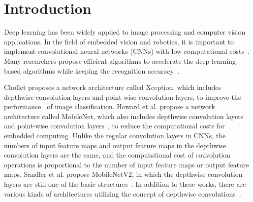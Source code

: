 \documentclass[runningheads]{llncs}
\begin{document}
\section{Introduction}
\label{sec:introduction}

Deep learning has been widely applied to image processing and computer vision applications. In the field of embedded vision and robotics, it is important to implement convolutional neural networks (CNNs) with low computational costs~\cite{Chen19}. Many researchers propose efficient algorithms to accelerate the deep-learning-based algorithms while keeping the recognition accuracy~\cite{Chollet16,Han19,Howard17,Qin20,Sandler18,Tan19,Tan19_2}.

Chollet proposes a network architecture called Xception, which includes depthwise convolution layers and point-wise convolution layers, to improve the performance~\cite{Chollet16} of image classification. Howard et al. propose a network architecture called MobileNet, which also includes depthwise convolution layers and point-wise convolution layers~\cite{Howard17}, to reduce the computational costs for embedded computing. Unlike the regular convolution layers in CNNs, the numbers of input feature maps and output feature maps in the depthwise convolution layers are the same, and the computational cost of convolution operations is proportional to the number of input feature maps or output feature maps. Sandler et al. propose MobileNetV2, in which the depthwise convolution layers are still one of the basic structures~\cite{Sandler18}. In addition to these works, there are various kinds of architectures utilizing the concept of depthwise convolutions~\cite{Han19,Tan19,Tan19_2}.
\end{document}
